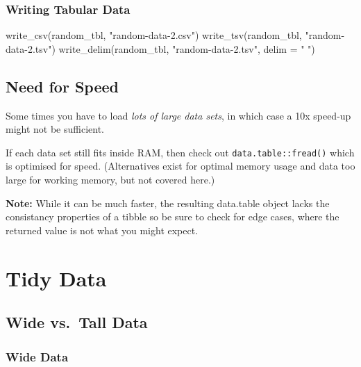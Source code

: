 \documentclass[
  12pt,
]{book}
\newenvironment{Shaded}{\begin{snugshade}}{\end{snugshade}}
\newcommand{\AttributeTok}[1]{\textcolor[rgb]{0.77,0.63,0.00}{#1}}
\newcommand{\FunctionTok}[1]{\textcolor[rgb]{0.00,0.00,0.00}{#1}}
\newcommand{\NormalTok}[1]{#1}
\newcommand{\StringTok}[1]{\textcolor[rgb]{0.31,0.60,0.02}{#1}}
\begin{document}
\hypertarget{writing-tabular-data}{%
\subsubsection{Writing Tabular Data}\label{writing-tabular-data}}

\begin{Shaded}
\begin{Highlighting}[]
\FunctionTok{write\_csv}\NormalTok{(random\_tbl, }\StringTok{"random{-}data{-}2.csv"}\NormalTok{)}
\FunctionTok{write\_tsv}\NormalTok{(random\_tbl, }\StringTok{"random{-}data{-}2.tsv"}\NormalTok{)}
\FunctionTok{write\_delim}\NormalTok{(random\_tbl, }\StringTok{"random{-}data{-}2.tsv"}\NormalTok{, }\AttributeTok{delim =} \StringTok{" "}\NormalTok{)}
\end{Highlighting}
\end{Shaded}

\hypertarget{need-for-speed}{%
\subsection{Need for Speed}\label{need-for-speed}}

Some times you have to load \emph{lots of large data sets}, in which case a 10x speed-up might not be sufficient.

If each data set still fits inside RAM, then check out \texttt{data.table::fread()} which is optimised for speed. (Alternatives exist for optimal memory usage and data too large for working memory, but not covered here.)

\textbf{Note:} While it can be much faster, the resulting data.table object lacks the consistancy properties of a tibble so be sure to check for edge cases, where the returned value is not what you might expect.

\hypertarget{tidy-data}{%
\section{Tidy Data}\label{tidy-data}}

\hypertarget{wide-vs.-tall-data}{%
\subsection{Wide vs.~Tall Data}\label{wide-vs.-tall-data}}

\hypertarget{wide-data}{%
\subsubsection{Wide Data}\label{wide-data}}
\end{document}

